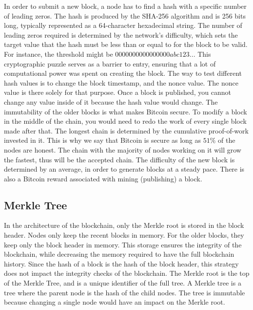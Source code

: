 In order to submit a new block, a node has to find a hash with a specific number of leading zeros.
The hash is produced by the SHA-256 algorithm and is 256 bits long, typically represented as a 64-character hexadecimal string. 
The number of leading zeros required is determined by the network's difficulty, which sets the target value that the hash must be less than or equal to for the block to be valid.
For instance, the threshold might be $0000000000000000abc123...$
This cryptographic puzzle serves as a barrier to entry, ensuring that a lot of computational power was spent on creating the block.
The way to test different hash values is to change the block timestamp, and the nonce value.
The nonce value is there solely for that purpose. Once a block is published, you cannot change any value inside of it because the hash value would change.
The immutability of the older blocks is what makes Bitcoin secure. To modify a block in the middle of the chain, you would need to redo the work of every single block made after that.
The longest chain is determined by the cumulative proof-of-work invested in it. This is why we say that Bitcoin is secure as long as $51\%$  of the nodes are honest.
The chain with the majority of nodes working on it will grow the fastest, thus will be the accepted chain.
The difficulty of the new block is determined by an average, in order to generate blocks at a steady pace. There is also a Bitcoin reward associated with mining (publishing) a block. \cite{MB17}


\subsection{Merkle Tree}
In the architecture of the blockchain, only the Merkle root is stored in the block header. Nodes only keep the recent blocks in memory. For the older blocks, they keep only the block header in memory.
This storage ensures the integrity of the blockchain, while decreasing the memory required to have the full blockchain history.
Since the hash of a block is the hash of the block header, this strategy does not impact the integrity checks of the blockchain.
The Merkle root is the top of the Merkle Tree, and is a unique identifier of the full tree. A Merkle tree is a tree where the parent node is the hash of the child nodes.
The tree is immutable because changing a single node would have an impact on the Merkle root.



